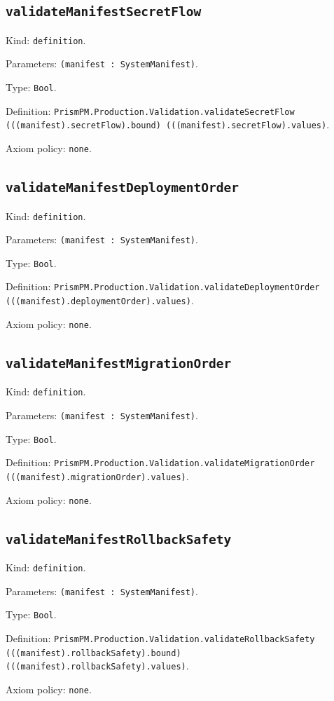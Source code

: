 \documentclass[11pt]{article}
\begin{document}
\subsection*{\texttt{validateManifestSecretFlow}}
\noindent Kind: \texttt{definition}.\par
\noindent Parameters: \texttt{(manifest : SystemManifest)}.\par
\noindent Type: \texttt{Bool}.\par
\noindent Definition: \texttt{PrismPM.Production.Validation.validateSecretFlow (((manifest).secretFlow).bound) (((manifest).secretFlow).values)}.\par
\noindent Axiom policy: \texttt{none}.\par
\subsection*{\texttt{validateManifestDeploymentOrder}}
\noindent Kind: \texttt{definition}.\par
\noindent Parameters: \texttt{(manifest : SystemManifest)}.\par
\noindent Type: \texttt{Bool}.\par
\noindent Definition: \texttt{PrismPM.Production.Validation.validateDeploymentOrder (((manifest).deploymentOrder).values)}.\par
\noindent Axiom policy: \texttt{none}.\par
\subsection*{\texttt{validateManifestMigrationOrder}}
\noindent Kind: \texttt{definition}.\par
\noindent Parameters: \texttt{(manifest : SystemManifest)}.\par
\noindent Type: \texttt{Bool}.\par
\noindent Definition: \texttt{PrismPM.Production.Validation.validateMigrationOrder (((manifest).migrationOrder).values)}.\par
\noindent Axiom policy: \texttt{none}.\par
\subsection*{\texttt{validateManifestRollbackSafety}}
\noindent Kind: \texttt{definition}.\par
\noindent Parameters: \texttt{(manifest : SystemManifest)}.\par
\noindent Type: \texttt{Bool}.\par
\noindent Definition: \texttt{PrismPM.Production.Validation.validateRollbackSafety (((manifest).rollbackSafety).bound) (((manifest).rollbackSafety).values)}.\par
\noindent Axiom policy: \texttt{none}.\par
\end{document}
